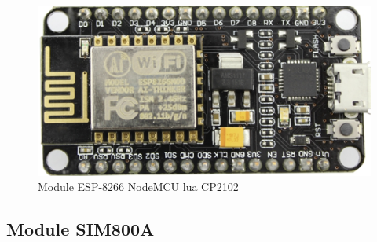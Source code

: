         \begin{figure}[!ht]
            \begin{center}
            \includegraphics[scale=0.9]{images/module-esp.png}
            \caption{Module ESP-8266 NodeMCU lua CP2102}
            \label{fig:moduleEsp}
            \end{center}
          \end{figure}

          \subsection{Module SIM800A}

